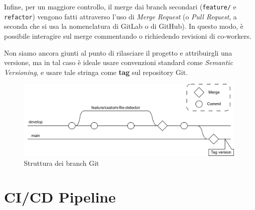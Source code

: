 Infine, per un maggiore controllo, il merge dai branch secondari (\texttt{feature/} e \texttt{refactor}) vengono fatti attraverso l'uso di \emph{Merge Request} (o \emph{Pull Request}, a seconda che si usa la nomenclatura di GitLab o di GitHub).
In questo modo, è possibile interagire sul merge commentando o richiedendo revisioni di co-workers.

Non siamo ancora giunti al punto di rilasciare il progetto e attribuirgli una versione, ma in tal caso è ideale usare convenzioni standard come \emph{Semantic Versioning}, e usare tale stringa come \textbf{tag} sul repository Git.

\begin{figure}[h!]
    \centering
    \includegraphics[width=\textwidth]{assets/git_branches_diagram.png}
    \caption{Struttura dei branch Git}
    \label{fig:git_branches_diagram}
\end{figure}

\section{CI/CD Pipeline}